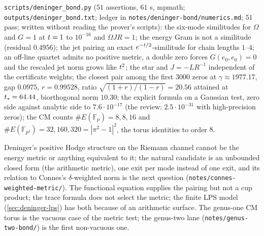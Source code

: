 \begin{numerical}
\label{num:deninger-bond}
\texttt{scripts/deninger\_bond.py} ($51$ assertions, $61$ s, mpmath; \texttt{outputs/deninger\_bond.txt}; ledger in
\texttt{notes/deninger-bond/numerics.md}; $51$ pass; written without reading the prover's scripts): the six-mode similitudes
for $\Omega$ and $G = 1$ at $t = 1$ to $10^{-16}$ and $\Omega JR = 1$; the energy Gram is not a similitude (residual $0.4956$); %
the jet pairing an exact $e^{-t/2}$-similitude for chain lengths $1$--$4$; an off-line quartet admits no positive metric, a
double zero forces $G(e_0,e_0) = 0$ and the rescaled jet norm grows like $t^2$; the star and $J = -LR^{-1}$ independent of the
certificate weights; the closest pair among the first $3000$ zeros at $\gamma\approx1977.17$, gap $0.0975$, $r = 0.99528$, ratio
$\sqrt{(1+r)/(1-r)} = 20.56$ attained at $t_{*} = 64.44$, biorthogonal norm $10.30$; the explicit formula on a Gaussian test,
zero side against analytic side to $7.6\cdot10^{-17}$ (the review: $2.5\cdot10^{-31}$ with high-precision zeros); the CM counts
$\#E(\mathbb F_p) = 8,8,16$ and $\#E(\mathbb F_{p^2}) = 32,160,320 = |\pi^2-1|^2$, the torus identities to order $8$.
\end{numerical}

\begin{observation}
\label{obs:deninger-bond-next}
Deninger's positive Hodge structure on the Riemann channel cannot be the energy metric or anything equivalent to it;
the natural candidate is an unbounded closed form (the arithmetic metric), one exit per mode instead of one exit,
and its relation to Connes's $\delta$-weighted norm is the next question (\texttt{notes/connes-weighted-metric/}). The
functional equation supplies the pairing but not a cup product; the trace formula does not select the metric; the finite
LPS model (\cref{sec:deninger-lps}) has both because of an arithmetic surface. The genus-one CM torus is the vacuous case
of the metric test; the genus-two lane (\texttt{notes/genus-two-bond/}) is the first non-vacuous one.
\end{observation}
